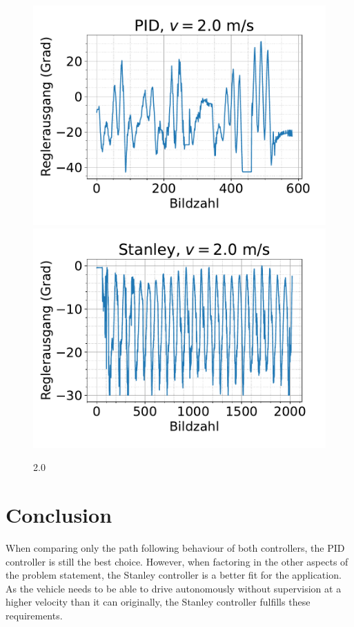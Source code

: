 \documentclass[arbeit=studie,oneside,BCOR=12mm]{ArbeitRST}
\begin{document}
\begin{figure}[h]
    \centering
    \includegraphics[scale=0.47]{pid2.0}
    \includegraphics[scale=0.47]{Stan2.0}
    \caption{2.0}
    \label{ausrei}
\end{figure}




\chapter{Conclusion}


When comparing only the path following behaviour of both controllers, the PID
controller is still the best choice. However, when factoring in the other
aspects of the problem statement, the Stanley controller is a better fit for
the application. As the vehicle needs to be able to drive autonomously without
supervision at a higher velocity than it can originally, the Stanley controller
fulfills these requirements. 
\end{document}
